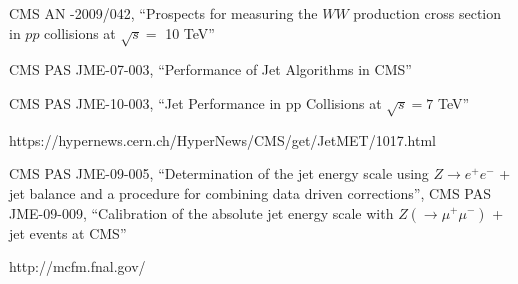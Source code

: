 \begin{thebibliography}{99}

CMS AN -2009/042, ``Prospects for measuring the $WW$ production 
cross section in $pp$ collisions at $\sqrt{s}=$ 10 TeV''

CMS PAS JME-07-003, ``Performance of Jet Algorithms in CMS''

CMS PAS JME-10-003, ``Jet Performance in pp Collisions at $\sqrt{s}=7$ TeV''

https://hypernews.cern.ch/HyperNews/CMS/get/JetMET/1017.html

CMS PAS JME-09-005, ``Determination of the jet energy scale using 
$Z\to e^+e^-$ + jet \pt balance and a procedure for combining data driven 
corrections'', 
CMS PAS JME-09-009, ``Calibration of the absolute jet energy scale with 
$Z(\to\mu^+\mu^-)$ + jet events at CMS''

http://mcfm.fnal.gov/

\end{thebibliography}
